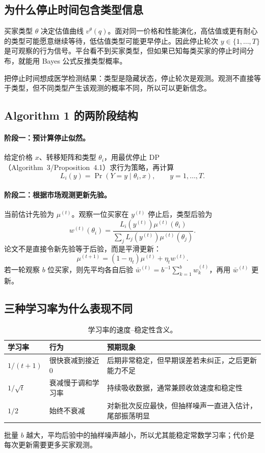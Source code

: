 \documentclass[11pt,a4paper]{ctexart}
\begin{document}
\subsection{为什么停止时间包含类型信息}
买家类型 $\theta$ 决定估值曲线 $v^\theta(q)$。面对同一价格和性能演化，高估值或更有耐心的类型可能愿意继续等待，低估值类型可能更早停止。因此停止轮次 $y\in\{1,\ldots,T\}$ 是可观察的行为信号。平台看不到买家类型，但如果已知每类买家的停止时间分布，就能用 Bayes 公式反推类型概率。

\begin{intuition}
把停止时间想成医学检测结果：类型是隐藏状态，停止轮次是观测。观测不直接等于类型，但不同类型产生该观测的概率不同，所以可以更新信念。
\end{intuition}

\subsection{Algorithm 1 的两阶段结构}
\paragraph{阶段一：预计算停止似然。}
给定价格 $x$、转移矩阵和类型 $\theta_i$，用最优停止 DP（Algorithm~3/Proposition~4.1）求行为策略，再计算
\[
L_i(y)=\Pr(Y=y\mid \theta_i,x),\qquad y=1,\ldots,T.
\]

\paragraph{阶段二：根据市场观测更新先验。}
当前估计先验为 $\mu^{(t)}$。观察一位买家在 $y^{(t)}$ 停止后，类型后验为
\begin{equation}
w^{(t)}(\theta_i)=\frac{L_i(y^{(t)})\mu^{(t)}(\theta_i)}{\sum_jL_j(y^{(t)})\mu^{(t)}(\theta_j)}.
\label{eq:bayes}
\end{equation}
论文不是直接令新先验等于后验，而是平滑更新：
\begin{equation}
\mu^{(t+1)}=(1-\eta_t)\mu^{(t)}+\eta_tw^{(t)}.
\label{eq:smooth}
\end{equation}
若一轮观察 $b$ 位买家，则先平均各自后验 $\bar w^{(t)}=b^{-1}\sum_{k=1}^bw_k^{(t)}$，再用 $\bar w^{(t)}$ 更新。

\subsection{三种学习率为什么表现不同}
\begin{table}[H]
\centering
\caption{学习率的速度--稳定性含义。}
\begin{tabularx}{\textwidth}{>{\bfseries}p{}p{}X}
\toprule
学习率 & 行为 & 预期现象\\
\midrule
$1/(t+1)$ & 很快衰减到接近 0 & 后期非常稳定，但早期误差若未纠正，之后更新能力不足\\
$1/\sqrt t$ & 衰减慢于调和学习率 & 持续吸收数据，通常兼顾收敛速度和稳定性\\
$1/2$ & 始终不衰减 & 对新批次反应最快，但抽样噪声一直进入估计，尾部振荡明显\\
\bottomrule
\end{tabularx}
\end{table}
批量 $b$ 越大，平均后验中的抽样噪声越小，所以尤其能稳定常数学习率；代价是每次更新需要更多买家观测。
\end{document}
